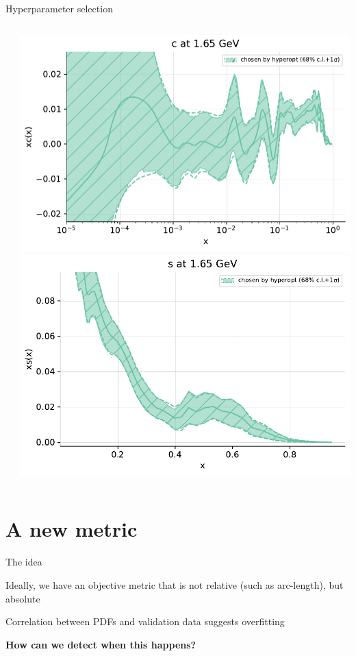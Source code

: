 \documentclass[aspectratio=169,11pt]{beamer}
\begin{document}
\begin{frame}[t]{Hyperparameter selection}
\begin{columns}[T]
\begin{column}{0.6\textwidth}
    \end{column}
    \begin{column}{0.4\textwidth}
      \vspace*{-12mm}
      \includegraphics[height=0.45\textheight]{hyperopt_choice_charm_plot_pdfs_c.pdf}\\
      \includegraphics[height=0.45\textheight]{hyperopt_choice_strange_plot_pdfs_s.pdf}
    \end{column}
  \end{columns}
\end{frame}






\section*{A new metric}

\begin{frame}[t]{The idea}

  Ideally, we have an objective metric that is not relative (such as arc-length), but absolute\\\vspace*{1em}

  Correlation between PDFs and validation data suggests overfitting\\\vspace*{1em}

  \textbf{How can we detect when this happens?}
\end{frame}
\end{document}
